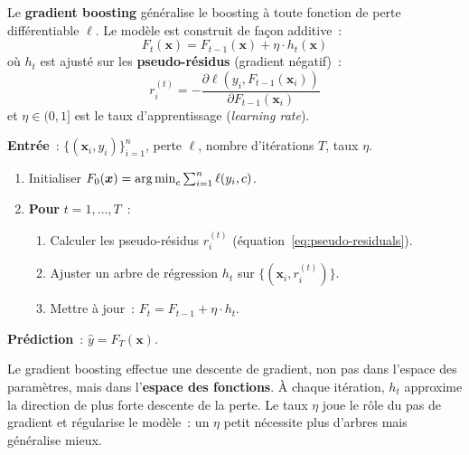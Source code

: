 \begin{definition}
Le \textbf{gradient boosting} g\'en\'eralise le boosting \`a toute fonction
de perte diff\'erentiable $\ell$. Le mod\`ele est construit de fa\c{c}on
additive~:
\begin{equation}
  F_t(\bm{x}) = F_{t-1}(\bm{x}) + \eta \cdot h_t(\bm{x})
\end{equation}
o\`u $h_t$ est ajust\'e sur les \textbf{pseudo-r\'esidus}
(gradient n\'egatif)~:
\begin{equation}
  r_i^{(t)} = -\frac{\partial \ell(y_i, F_{t-1}(\bm{x}_i))}
    {\partial F_{t-1}(\bm{x}_i)}
  \label{eq:pseudo-residuals}
\end{equation}
et $\eta \in (0, 1]$ est le taux d'apprentissage (\emph{learning rate}).
\end{definition}

\begin{algorithme}[title=\textbf{Algorithme Gradient Boosting}]
\textbf{Entr\'ee}~: $\{(\bm{x}_i, y_i)\}_{i=1}^n$, perte $\ell$, nombre
d'it\'erations $T$, taux $\eta$.

\begin{enumerate}
  \item Initialiser $F_0(\bm{x}) = \operatorname*{arg\,min}_c \sum_{i=1}^n \ell(y_i, c)$.
  \item \textbf{Pour} $t = 1, \ldots, T$~:
    \begin{enumerate}
      \item Calculer les pseudo-r\'esidus $r_i^{(t)}$
        (\'equation~\eqref{eq:pseudo-residuals}).
      \item Ajuster un arbre de r\'egression $h_t$ sur
        $\{(\bm{x}_i, r_i^{(t)})\}$.
      \item Mettre \`a jour~: $F_t = F_{t-1} + \eta \cdot h_t$.
    \end{enumerate}
\end{enumerate}
\textbf{Pr\'ediction}~: $\hat{y} = F_T(\bm{x})$.
\end{algorithme}

\begin{intuition}[title=\textbf{Descente de gradient dans l'espace fonctionnel}]
Le gradient boosting effectue une descente de gradient, non pas dans l'espace
des param\`etres, mais dans l'\textbf{espace des fonctions}. \`A chaque
it\'eration, $h_t$ approxime la direction de plus forte descente de la perte.
Le taux $\eta$ joue le r\^ole du pas de gradient et r\'egularise le mod\`ele~:
un $\eta$ petit n\'ecessite plus d'arbres mais g\'en\'eralise mieux.
\end{intuition}

